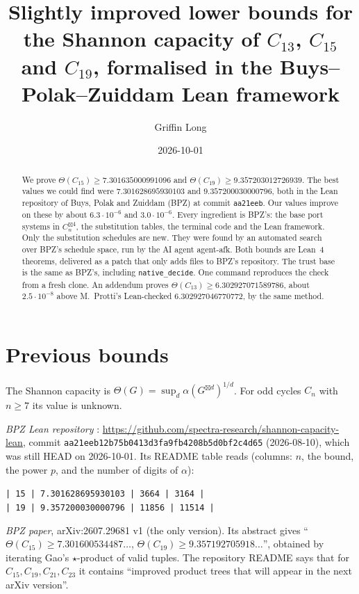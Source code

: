 \documentclass[11pt]{amsart}
\title[Shannon capacity of $C_{13}$, $C_{15}$ and $C_{19}$]{Slightly improved lower bounds for the Shannon capacity of $C_{13}$, $C_{15}$ and $C_{19}$, formalised in the Buys--Polak--Zuiddam Lean framework}
\author{Griffin Long}
\date{2026-10-01}
\newcommand{\T}{\Theta}
\newcommand{\sbx}{\boxtimes}
\newcommand{\code}[1]{\texttt{#1}}
\begin{document}
\sloppy

\begin{abstract}
We prove $\T(C_{15})\ge 7.301635000991096$ and $\T(C_{19})\ge 9.357203012726939$. The best values
we could find were $7.301628695930103$ and $9.357200030000796$, both in the Lean repository of
Buys, Polak and Zuiddam (BPZ) at commit \code{aa21eeb}. Our values improve on these by about
$6.3\cdot10^{-6}$ and $3.0\cdot10^{-6}$. Every ingredient is BPZ's: the base port systems in
$C_n^{\sbx 4}$, the substitution tables, the terminal code and the Lean framework. Only the
substitution schedules are new. They were found by an automated search over BPZ's schedule
space, run by the AI agent agent-afk. Both bounds are Lean~4 theorems, delivered as a patch that
only adds files to BPZ's repository. The trust base is the same as BPZ's, including
\code{native\_decide}. One command reproduces the check from a fresh clone.
An addendum proves $\T(C_{13})\ge 6.302927071589786$, about $2.5\cdot10^{-8}$ above
M.~Protti's Lean-checked $6.302927046770772$, by the same method.
\end{abstract}

\maketitle

\section{Previous bounds}

The Shannon capacity is $\T(G)=\sup_d \alpha(G^{\sbx d})^{1/d}$. For odd cycles $C_n$ with
$n\ge 7$ its value is unknown.

\emph{BPZ Lean repository} \cite{BPZ}: \url{https://github.com/spectra-research/shannon-capacity-lean},
commit \code{aa21eeb12b75b0413d3fa9fb4208b5d0bf2c4d65} (2026-08-10), which was still HEAD on
2026-10-01. Its README table reads (columns: $n$, the bound, the power $p$, and the number of
digits of $\alpha$):
\begin{center}\small
\code{| 15 | 7.301628695930103 | 3664 | 3164 |}\\
\code{| 19 | 9.357200030000796 | 11856 | 11514 |}
\end{center}

\emph{BPZ paper}, arXiv:2607.29681 v1 (the only version). Its abstract gives
``$\T(C_{15})\ge 7.301600534487\ldots$, $\T(C_{19})\ge 9.357192705918\ldots$'', obtained by
iterating Gao's $\star$-product \cite{Gao} of valid tuples. The repository README says that for
$C_{15}, C_{19}, C_{21}, C_{23}$ it contains ``improved product trees that will appear in the next
arXiv version''.
\end{document}
